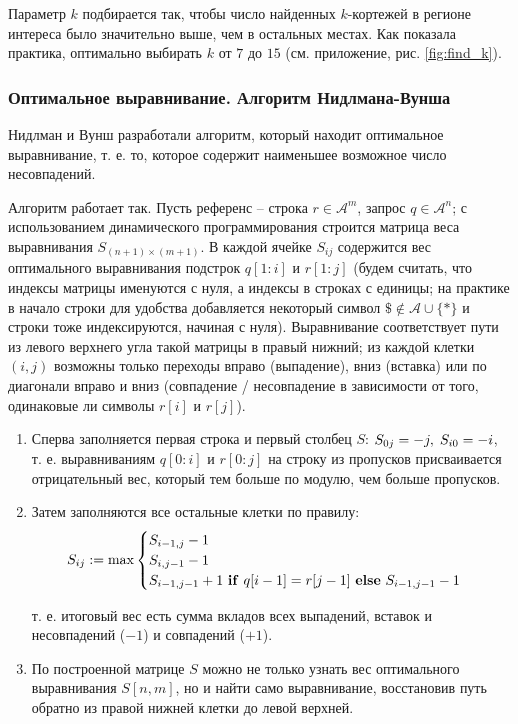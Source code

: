 \documentclass{main.tex}[subfiles]
\begin{document}
Параметр $k$ подбирается так, чтобы число найденных $k$-кортежей в регионе интереса было значительно выше, чем в остальных местах.
Как показала практика, оптимально выбирать $k$ от $7$ до $15$ (см. приложение, рис. \ref{fig:find_k}).

\subsubsection{Оптимальное выравнивание. Алгоритм Нидлмана-Вунша}

Нидлман и Вунш \cite{needleman1970} разработали алгоритм, который находит оптимальное выравнивание, т. е. то, которое содержит наименьшее возможное число несовпадений.

Алгоритм работает так.
Пусть референс -- строка $r \in \mathcal{A}^m $, запрос $q \in \mathcal{A}^n$; с использованием динамического программирования строится матрица веса выравнивания $S_{(n+1)\times (m+1)}$.
В каждой ячейке $S_{ij}$ содержится вес оптимального выравнивания подстрок $q[1:i]$ и $r[1:j]$ (будем считать, что индексы матрицы именуются с нуля, а индексы в строках с единицы; на практике в начало строки для удобства добавляется некоторый символ $ \$ \notin \mathcal{A} \cup \{ \ast \} $ и строки тоже индексируются, начиная с нуля).
Выравнивание соответствует пути из левого верхнего угла такой матрицы в правый нижний; из каждой клетки $(i,j)$ возможны только переходы вправо (выпадение), вниз (вставка) или по диагонали вправо и вниз (совпадение / несовпадение в зависимости от того, одинаковые ли символы $r[i]$ и $r[j]$).
\begin{enumerate}
    \item Сперва заполняется первая строка и первый столбец $S$: $S_{0j} = -j, \thickspace S_{i0} = -i$, т. е. выравниваниям $q[0:i]$ и  $r[0:j]$ на строку из пропусков присваивается отрицательный вес, который тем больше по модулю, чем больше пропусков.
    \item Затем заполняются все остальные клетки по правилу:
    \[ S_{ij} := \max \begin{cases}
        S_{i-1,j} - 1 \\
        S_{i,j-1} - 1 \\
        S_{i-1,j-1} + 1 \text{ \textbf{if} } q[i-1] = r[j-1] \text{ \textbf{else} } S_{i-1,j-1} - 1
    \end{cases} \]

    т. е. итоговый вес есть сумма вкладов всех выпадений, вставок и несовпадений ($-1$) и совпадений ($+1$).
    \item По построенной матрице $ S $ можно не только узнать вес оптимального выравнивания $S[n,m]$, но и найти само выравнивание, восстановив путь обратно из правой нижней клетки до левой верхней.

\end{enumerate}
\end{document}
